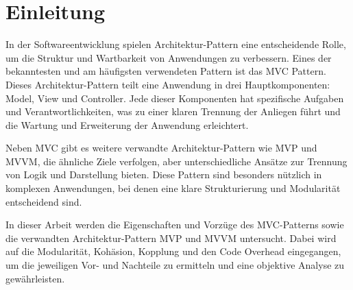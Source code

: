 
\chapter{Einleitung}

In der Softwareentwicklung spielen Architektur-Pattern eine entscheidende Rolle, um die Struktur und Wartbarkeit von Anwendungen zu verbessern. Eines der bekanntesten und am häufigsten verwendeten Pattern ist das \ac{MVC} Pattern. Dieses Architektur-Pattern teilt eine Anwendung in drei Hauptkomponenten: Model, View und Controller. Jede dieser Komponenten hat spezifische Aufgaben und Verantwortlichkeiten, was zu einer klaren Trennung der Anliegen führt und die Wartung und Erweiterung der Anwendung erleichtert.

Neben \ac{MVC} gibt es weitere verwandte Architektur-Pattern wie \ac{MVP} und \ac{MVVM}, die ähnliche Ziele verfolgen, aber unterschiedliche Ansätze zur Trennung von Logik und Darstellung bieten. Diese Pattern sind besonders nützlich in komplexen Anwendungen, bei denen eine klare Strukturierung und Modularität entscheidend sind.

In dieser Arbeit werden die Eigenschaften und Vorzüge des \ac{MVC}-Patterns sowie die verwandten Architektur-Pattern \ac{MVP} und \ac{MVVM} untersucht. Dabei wird auf die Modularität, Kohäsion, Kopplung und den Code Overhead eingegangen, um die jeweiligen Vor- und Nachteile zu ermitteln und eine objektive Analyse zu gewährleisten.
